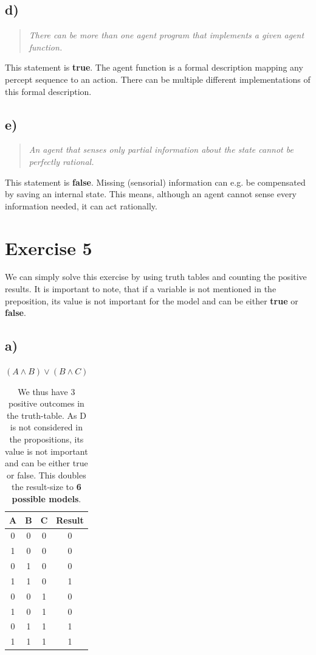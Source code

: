 \documentclass[11pt]{article}
\begin{document}
\subsection*{d)}
\begin{quotation}\noindent
\textit{There can be more than one agent program that implements a given agent function.}
\end{quotation}
\noindent
This statement is \textbf{true}. The agent function is a formal description mapping any percept sequence to an action. There can be multiple different implementations of this formal description.

\subsection*{e)}
\begin{quotation}\noindent
\textit{An agent that senses only partial information about the state cannot be perfectly rational.}
\end{quotation}
\noindent
This statement is \textbf{false}. Missing (sensorial) information can e.g. be compensated by saving an internal state. This means, although an agent cannot sense every information needed, it can act rationally.

\newpage

\section*{Exercise 5}
\noindent We can simply solve this exercise by using truth tables and counting the positive results. It is important to note, that if a variable is not mentioned in the preposition, its value is not important for the model and can be either \textbf{true} or \textbf{false}.

\subsection*{a)} 
$(A \wedge B) \vee (B \wedge C)$
\begin{table}[h]
  \begin{tabular}{c|c|c||c}
    A & B & C & Result\\
    \hline
    0 & 0 & 0 & 0 \\
    1 & 0 & 0 & 0 \\
    0 & 1 & 0 & 0 \\
    1 & 1 & 0 & 1 \\
    0 & 0 & 1 & 0 \\
    1 & 0 & 1 & 0 \\
    0 & 1 & 1 & 1 \\
    1 & 1 & 1 & 1
  \end{tabular}
  \caption*{We thus have 3 positive outcomes in the truth-table. As D is not considered in the propositions, its value is not important and can be either true or false. This doubles the result-size to \textbf{6 possible models}.}
\end{table}
\end{document}
